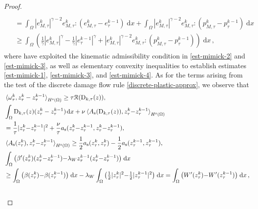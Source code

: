 \documentclass[a4paper,10pt,reqno]{amsart}
\numberwithin{equation}{section}
\numberwithin{equation}{section}
\def\dd{\;\!\mathrm{d}} %
\newcommand{\pairing}[4]{ \sideset{_{ #1 }}{_{ #2 }}  {\mathop{\langle #3 , #4
\rangle}}}
\newcommand{\Did}[1]{\mathcal{R}(#1)}
\newcommand{\spz}{H^{\mathrm{s}}(\Omega)}
\newcommand{\As}{A_{\mathrm{s}}}
\newcommand{\ass}{a_{\mathrm{s}}}
\newcommand{\ptau}[1]{p_\tau^{#1}}
\newcommand{\ztau}[1]{z_\tau^{#1}}
\newcommand{\etau}[1]{e_\tau^{#1}}
\newcommand{\Dtau}[2]{\mathrm{D}_{#1,\tau}(#2)}
\newcommand{\ptaum}[1]{p_{M,\tau}^{#1}}
\newcommand{\etaum}[1]{e_{M,\tau}^{#1}}
\newcommand{\omegatau}[1]{\omega_\tau^{#1}}
\begin{document}
\begin{proof}
\begin{subequations}
\begin{align}
\begin{aligned}
\\ & =  \int_\Omega |\etaum k|^{\gamma-2} \etaum k   :   (\etaum k {-} \etau{k-1})  \dd x + \int_\Omega   |\etaum k|^{\gamma-2} \etaum k   :   (\ptaum k {-} \ptau{k-1})  \dd x  \\ & 
 \geq\int_\Omega \left(  \tfrac1{\gamma} |\etaum k|^{\gamma} {-} \tfrac1{\gamma} |\etau {k-1}|^\gamma {+}  |\etaum k|^{\gamma-2} \etaum k   :   (\ptaum k{ -} \ptau{k-1})  \right) \dd x \,,
 \end{aligned}
 \end{align}
 \end{subequations}
 where have exploited the kinematic admissibility condition in  \eqref{est-mimick-2} and  \eqref{est-mimick-3}, 
 as well as elementary convexity inequalities to establish estimates \eqref{est-mimick-1}, \eqref{est-mimick-3}, and  \eqref{est-mimick-4}. 
 As for the terms arising from the test of the discrete damage flow rule \eqref{discrete-plastic-approx},  we observe that 
 \begin{subequations}
  \label{est-mimick-5}
  \begin{align}
   \label{est-mimick-5-1}
 &
 \pairing{}{\spz}{\omegatau{k}}{\ztau k-\ztau{k-1}} \geq \tau \Did{\Dtau {k}z},
 \\
 &
  \label{est-mimick-5-2}
  \begin{aligned}
  &
  \int_\Omega \Dtau {k}z (\ztau k-\ztau{k-1}) \dd x + \nu \pairing{}{\spz}{\As(\Dtau k z)}{\ztau{k}{-}\ztau{k-1}} \\ & = \frac1{\tau} |\ztau{k}{-}\ztau{k-1}|^2 + \frac{\nu}{\tau} 
 \ass (\ztau{k}{-}\ztau{k-1},\ztau{k}{-}\ztau{k-1}),
 \end{aligned}
 \\
 & 
  \label{est-mimick-5-3}
 \pairing{}{\spz}{\As(\ztau k)}{\ztau{k} {-} \ztau{k-1}} \geq \frac12 \ass (\ztau k,\ztau k) - \frac12 \ass (\ztau{k-1},\ztau{k-1}),
 \\
 &
  \label{est-mimick-5-4}
  \begin{aligned}
  &
 \int_\Omega \left(  \beta'(\ztau k)(\ztau{k} {-} \ztau{k-1}) {-} \lambda_W \ztau{k-1} (\ztau{k} {-} \ztau{k-1})  \right)   \dd x  
 \\
 & \geq \int_\Omega\left( \beta(\ztau k) {-} \beta(\ztau {k-1}) \right)  \dd x -\lambda_W \int_\Omega \left(\tfrac12  |\ztau {k}|^2 {-} \tfrac12  |\ztau {k-1}|^2  \right) \dd x 
  = \int_\Omega \left( W'(\ztau k) {-} W'(\ztau{k-1})  \right) \dd x\,,
 \end{aligned}
 \\
 & 
  \label{est-mimick-5-6}

\end{align}
\end{subequations}
\end{proof}
\end{document}
